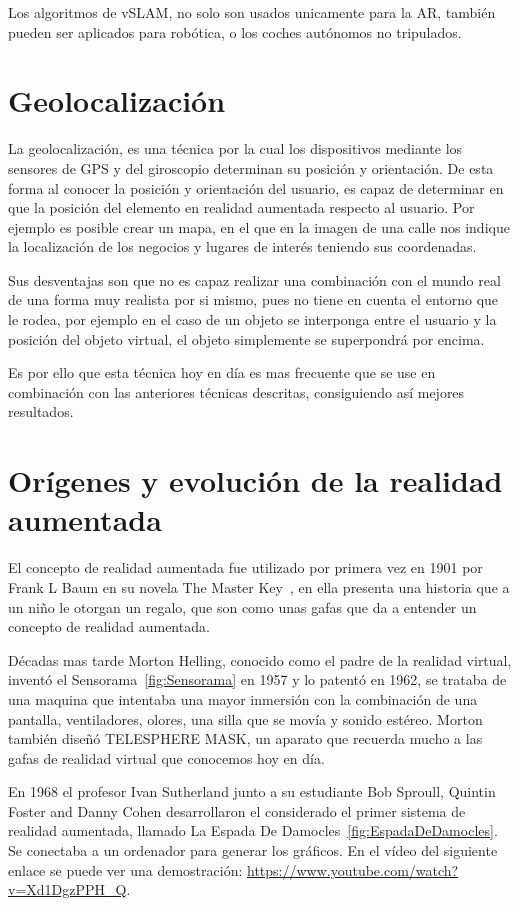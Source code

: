 Los algoritmos de vSLAM, no solo son usados unicamente para la AR, también pueden ser aplicados para robótica, o los coches autónomos no tripulados.
\section{Geolocalización}
La geolocalización, es una técnica por la cual los dispositivos mediante los sensores de GPS y del giroscopio determinan su posición y orientación. De esta forma al conocer la posición y orientación del usuario, es capaz de determinar en que la posición del elemento en realidad aumentada respecto al usuario.
Por ejemplo es posible crear un mapa, en el que en la imagen de una calle nos indique la localización de los negocios y lugares de interés teniendo sus coordenadas.

Sus desventajas son que no es capaz realizar una combinación con el mundo real de una forma muy realista por si mismo, pues no tiene en cuenta el entorno que le rodea, por ejemplo en el caso de un objeto se interponga entre el usuario y la posición del objeto virtual, el objeto simplemente se superpondrá por encima.

Es por ello que esta técnica hoy en día es mas frecuente que se use en combinación con las anteriores técnicas descritas, consiguiendo así mejores resultados.

\section{Orígenes y evolución de la realidad aumentada}
El concepto de realidad aumentada fue utilizado por primera vez en 1901 por Frank L Baum en su novela The Master Key~\cite{theMasterKey}, en ella presenta una historia que a un niño le otorgan un regalo, que son como unas gafas que da a entender un concepto de realidad aumentada.

Décadas mas tarde Morton Helling, conocido como el padre de la realidad virtual, inventó el Sensorama~\ref{fig:Sensorama} en 1957 y lo patentó en 1962, se trataba de una maquina que intentaba una mayor inmersión con la combinación de una pantalla, ventiladores, olores, una silla que se movía y sonido estéreo. Morton también diseñó TELESPHERE MASK, un aparato que recuerda mucho a las gafas de realidad virtual que conocemos hoy en día.


En 1968 el profesor Ivan Sutherland junto a su estudiante Bob Sproull, Quintin Foster and Danny Cohen desarrollaron el considerado el primer sistema de realidad aumentada, llamado La Espada De Damocles~\ref{fig:EspadaDeDamocles}. Se conectaba a un ordenador para generar los gráficos. En el vídeo del siguiente enlace se puede ver una demostración: \url{https://www.youtube.com/watch?v=Xd1DgzPPH_Q}.

